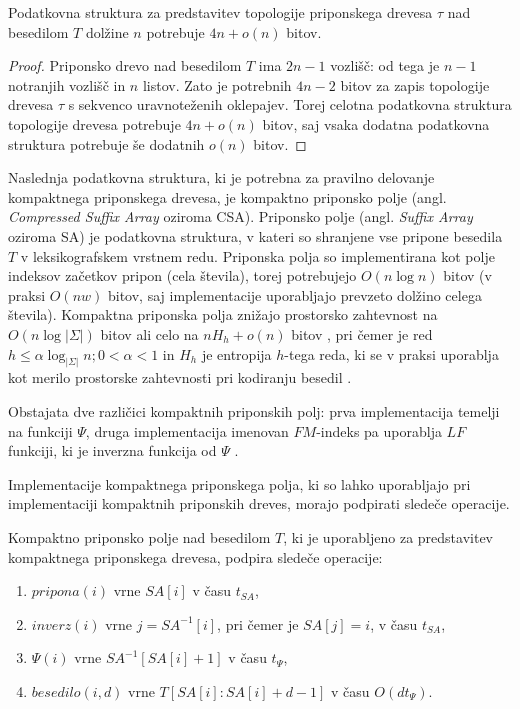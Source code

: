 \begin{lema}\label{lema:BP}
 Podatkovna struktura za predstavitev topologije priponskega drevesa $\tau$ nad besedilom $T$ dolžine $n$ potrebuje $4n+o(n)$ bitov.
\end{lema}

\begin{proof}
Priponsko drevo nad besedilom $T$ ima $2n-1$ vozlišč: od tega je $n-1$ notranjih vozlišč in $n$ listov. Zato je potrebnih $4n-2$ bitov za zapis topologije drevesa $\tau$ s sekvenco uravnoteženih oklepajev. Torej celotna podatkovna struktura topologije drevesa potrebuje $4n+o(n)$ bitov, saj vsaka dodatna podatkovna struktura potrebuje še dodatnih $o(n)$ bitov.
\end{proof}

Naslednja podatkovna struktura, ki je potrebna za pravilno delovanje kompaktnega priponskega drevesa, je kompaktno priponsko polje (angl. \textit{Compressed Suffix Array} oziroma CSA). Priponsko polje (angl. \textit{Suffix Array} oziroma SA) je podatkovna struktura, v kateri so shranjene vse pripone besedila $T$ v leksikografskem vrstnem redu. Priponska polja so implementirana kot polje indeksov začetkov pripon (cela števila), torej potrebujejo $O(n\log{n})$ bitov (v praksi $O(nw)$ bitov, saj implementacije uporabljajo prevzeto dolžino celega števila). Kompaktna priponska polja znižajo prostorsko zahtevnost na $O(n\log{|\Sigma|})$ bitov \cite{Grossi2000} ali celo na $nH_h +o(n)$ bitov \cite{Grossi2003}, pri čemer je red $h\le\alpha\log_{|\Sigma|}{n};0<\alpha<1$ in $H_h$ je entropija $h$-tega reda, ki se v praksi uporablja kot merilo prostorske zahtevnosti pri kodiranju besedil \cite{Navarro2016}.

Obstajata dve različici kompaktnih priponskih polj: prva implementacija temelji na funkciji $\Psi$, druga implementacija imenovan $FM$-indeks pa uporablja $LF$ funkciji, ki je inverzna funkcija od $\Psi$ \cite{Navarro2016, Sadakane2007}.

Implementacije kompaktnega priponskega polja, ki so lahko uporabljajo pri implementaciji kompaktnih priponskih dreves, morajo podpirati sledeče operacije.

\begin{defi}\label{def:csa}
     Kompaktno priponsko polje nad besedilom $T$, ki je uporabljeno za predstavitev kompaktnega priponskega drevesa, podpira sledeče operacije:
    \begin{enumerate}
        \item $pripona(i)$ vrne $SA[i]$ v času $t_{SA}$,
        \item $inverz(i)$ vrne $j=SA^{-1}[i]$, pri čemer je $SA[j]=i$, v času $t_{SA}$,
        \item $\Psi(i)$ vrne $SA^{-1}[SA[i]+1]$ v času $t_\Psi$,
        \item $besedilo(i,d)$ vrne $T[SA[i]:SA[i]+d-1]$ v času $O(dt_\Psi)$.
    \end{enumerate}    
\end{defi}

